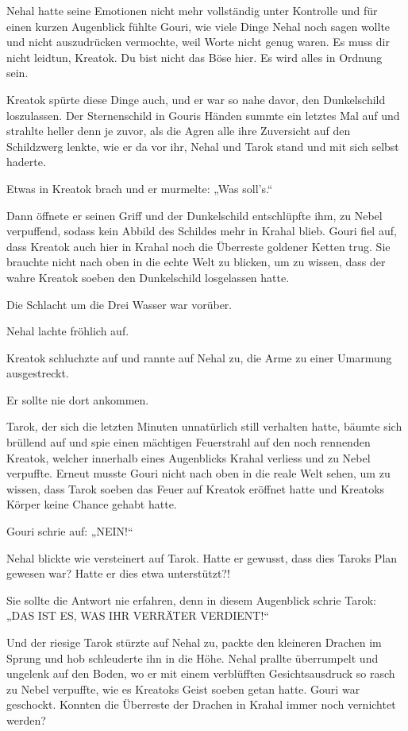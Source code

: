 Nehal hatte seine Emotionen nicht mehr vollständig unter Kontrolle und für einen kurzen Augenblick fühlte Gouri, wie viele Dinge Nehal noch sagen wollte und nicht auszudrücken vermochte, weil Worte nicht genug waren. Es muss dir nicht leidtun, Kreatok. Du bist nicht das Böse hier. Es wird alles in Ordnung sein.

Kreatok spürte diese Dinge auch, und er war so nahe davor, den Dunkelschild loszulassen. Der Sternenschild in Gouris Händen summte ein letztes Mal auf und strahlte heller denn je zuvor, als die Agren alle ihre Zuversicht auf den Schildzwerg lenkte, wie er da vor ihr, Nehal und Tarok stand und mit sich selbst haderte.

Etwas in Kreatok brach und er murmelte: „Was soll’s.“

Dann öffnete er seinen Griff und der Dunkelschild entschlüpfte ihm, zu Nebel verpuffend, sodass kein Abbild des Schildes mehr in Krahal blieb. Gouri fiel auf, dass Kreatok auch hier in Krahal noch die Überreste goldener Ketten trug. Sie brauchte nicht nach oben in die echte Welt zu blicken, um zu wissen, dass der wahre Kreatok soeben den Dunkelschild losgelassen hatte.

Die Schlacht um die Drei Wasser war vorüber.

Nehal lachte fröhlich auf.

Kreatok schluchzte auf und rannte auf Nehal zu, die Arme zu einer Umarmung ausgestreckt.

Er sollte nie dort ankommen.

Tarok, der sich die letzten Minuten unnatürlich still verhalten hatte, bäumte sich brüllend auf und spie einen mächtigen Feuerstrahl auf den noch rennenden Kreatok, welcher innerhalb eines Augenblicks Krahal verliess und zu Nebel verpuffte. Erneut musste Gouri nicht nach oben in die reale Welt sehen, um zu wissen, dass Tarok soeben das Feuer auf Kreatok eröffnet hatte und Kreatoks Körper keine Chance gehabt hatte.

Gouri schrie auf: „NEIN!“

Nehal blickte wie versteinert auf Tarok. Hatte er gewusst, dass dies Taroks Plan gewesen war? Hatte er dies etwa unterstützt?!

Sie sollte die Antwort nie erfahren, denn in diesem Augenblick schrie Tarok: „DAS IST ES, WAS IHR VERRÄTER VERDIENT!“

Und der riesige Tarok stürzte auf Nehal zu, packte den kleineren Drachen im Sprung und hob schleuderte ihn in die Höhe. Nehal prallte überrumpelt und ungelenk auf den Boden, wo er mit einem verblüfften Gesichtsausdruck so rasch zu Nebel verpuffte, wie es Kreatoks Geist soeben getan hatte. Gouri war geschockt. Konnten die Überreste der Drachen in Krahal immer noch vernichtet werden?

